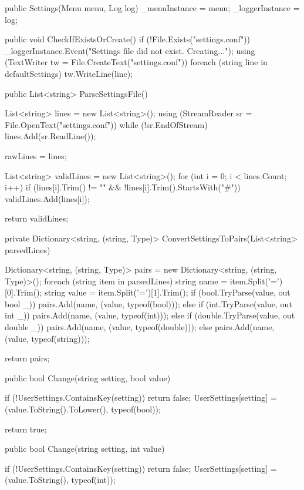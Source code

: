\begin{flushleft}
\begin{cscode}
{    public Settings(Menu menu, Log log)
    {
        _menuInstance = menu;
        _loggerInstance = log;
    }

    public void CheckIfExistsOrCreate()
    {
        if (!File.Exists("settings.conf"))
        {
            _loggerInstance.Event("Settings file did not exist. Creating...");
            using (TextWriter tw = File.CreateText("settings.conf"))
            {
                foreach (string line in defaultSettings)
                {
                    tw.WriteLine(line);
                }
            }
        }
    }

    public List<string> ParseSettingsFile()
    {
        List<string> lines = new List<string>();
        using (StreamReader sr = File.OpenText("settings.conf"))
        {
            while (!sr.EndOfStream)
            {
                lines.Add(sr.ReadLine());
            }
        }

        rawLines = lines;

        List<string> validLines = new List<string>();
        for (int i = 0; i < lines.Count; i++)
        {
            if (lines[i].Trim() != "" && !lines[i].Trim().StartsWith("#")) validLines.Add(lines[i]);
        }

        return validLines;
    }

    private Dictionary<string, (string, Type)> ConvertSettingsToPairs(List<string> parsedLines)
    {
        Dictionary<string, (string, Type)> pairs = new Dictionary<string, (string, Type)>();
        foreach (string item in parsedLines)
        {
            string name = item.Split('=')[0].Trim();
            string value = item.Split('=')[1].Trim();
            if (bool.TryParse(value, out bool _)) pairs.Add(name, (value, typeof(bool)));
            else if (int.TryParse(value, out int _)) pairs.Add(name, (value, typeof(int)));
            else if (double.TryParse(value, out double _)) pairs.Add(name, (value, typeof(double)));
            else pairs.Add(name, (value, typeof(string)));
        }

        return pairs;
    }

    public bool Change(string setting, bool value)
    {
        if (!UserSettings.ContainsKey(setting)) return false;
        UserSettings[setting] = (value.ToString().ToLower(), typeof(bool));

        return true;
    }

    public bool Change(string setting, int value)
    {
        if (!UserSettings.ContainsKey(setting)) return false;
        UserSettings[setting] = (value.ToString(), typeof(int));

}}
\end{cscode}
\end{flushleft}
